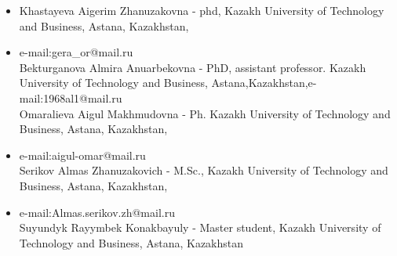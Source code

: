 \begin{itemize}
\item
Khastayeva Aigerim Zhanuzakovna - phd, Kazakh University of Technology
and Business, Astana, Kazakhstan,

\item
e-mail:gera\_or@mail.ru\\
Bekturganova Almira Anuarbekovna - PhD, assistant professor. Kazakh
University of Technology and Business,
Astana,Kazakhstan,e-mail:1968al1@mail.ru\\
Omaralieva Aigul Makhmudovna - Ph. Kazakh University of Technology and
Business, Astana, Kazakhstan,

\item
e-mail:aigul-omar@mail.ru\\
Serikov Almas Zhanuzakovich - M.Sc., Kazakh University of Technology and
Business, Astana, Kazakhstan,

\item
e-mail:Almas.serikov.zh@mail.ru\\
Suyundyk Rayymbek Konakbayuly - Master student, Kazakh University of
Technology and Business, Astana, Kazakhstan
\end{itemize}
